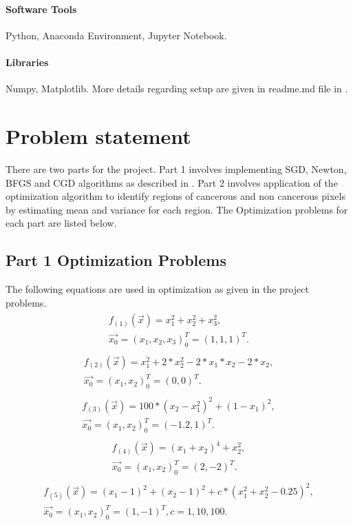 \documentclass[paper=a4, fontsize=11pt]{scrartcl}
\numberwithin{equation}{section}		%
\numberwithin{figure}{section}			%
\numberwithin{table}{section}				%
\begin{document}
\paragraph{Software Tools\newline}
Python, Anaconda Environment, Jupyter Notebook.
\paragraph{Libraries\newline}
Numpy, Matplotlib.\newline
More details regarding setup are given in readme.md file in \cite{last}.
\section{Problem statement}
There are two parts for the project. Part 1 involves implementing SGD, Newton, BFGS and CGD algorithms as described in \cite{one}. Part 2 involves application of the optimization algorithm to identify regions of cancerous and non cancerous pixels by estimating mean and variance for each region. The Optimization problems for each part are listed below.
\subsection{Part 1 Optimization Problems}
The following equations are used in optimization as given in the project problems.
\begin{align}
\label{eqn:e1}
\begin{split}
 f_{(1)}(\vec{x})=x_1^2+x_2^2+x_3^2 ,
\\
 \vec{x_0}=(x_1,x_2,x_3)_0^T=(1,1,1)^T.
\end{split}
\end{align}
\begin{align}
\label{eqn:e2}
\begin{split}
 f_{(2)}(\vec{x})=x_1^2 + 2*x_2^2 - 2*x_1*x_2 - 2*x_2,
\\
 \vec{x_0}=(x_1,x_2)_0^T=(0,0)^T.
\end{split}
\end{align}
\begin{align}
\label{eqn:e3}
\begin{split}
 f_{(3)}(\vec{x})=100*(x_2-x_1^2)^2 + (1-x_1)^2 ,
\\
 \vec{x_0}=(x_1,x_2)_0^T=(-1.2,1)^T.
\end{split}
\end{align}
\begin{align}
\label{eqn:e4}
\begin{split}
 f_{(4)}(\vec{x})=(x_1 + x_2)^4 + x_2^2 ,
\\
 \vec{x_0}=(x_1,x_2)_0^T=(2,-2)^T.
\end{split}
\end{align}
\begin{align}
\label{eqn:e5}
\begin{split}
 f_{(5)}(\vec{x})=(x_1 - 1)^2 + (x_2 - 1)^2 + c*(x_1^2+x_2^2-0.25)^2 ,
\\
 \vec{x_0}=(x_1,x_2)_0^T=(1,-1)^T,c=1,10,100.
\end{split}
\end{align}
\end{document}
